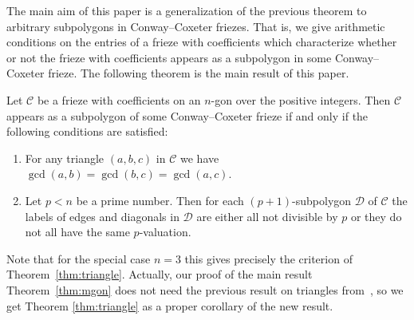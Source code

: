 \documentclass[ALCO,ThmDefs,Unicode,epreuves,published]{cedram}
\numberwithin{equation}{section}
\begin{document}
The main aim of this paper is a generalization of the previous theorem 
to arbitrary subpolygons in Conway--Coxeter friezes. That is, we give 
arithmetic conditions on the entries of a frieze with coefficients
which characterize whether
or not the frieze with coefficients appears as a subpolygon in some 
Conway--Coxeter frieze. 
The following theorem is the main result of this paper.


\begin{theo} \label{thm:mgon}
Let $\mathcal{C}$ be a frieze with coefficients 
on an $n$-gon over the positive integers. Then $\mathcal{C}$ appears as a
subpolygon
of some Conway--Coxeter frieze if and only if the following conditions are
satisfied:
\begin{enumerate}
\item \label{cond:gcd}
For any triangle $(a,b,c)$ in $\mathcal{C}$ we have
$\gcd(a,b)=\gcd(b,c)=\gcd(a,c)$.
\item \label{cond:p+1}
Let $p<n$ be a prime number. Then for each $(p+1)$-subpolygon $\mathcal{D}$
of $\mathcal{C}$ the labels of edges and diagonals in $\mathcal{D}$ are either
all not divisible by $p$ or they do not all have the same $p$-valuation.
\end{enumerate}
\end{theo}


Note that for the special case $n=3$ this gives precisely the criterion of 
Theorem~\ref{thm:triangle}. Actually, our proof of the main result 
Theorem~\ref{thm:mgon}
does not need the previous result on triangles from~\cite{CHJ}, 
so we get Theorem 
\ref{thm:triangle} as a proper corollary of the new result.
\end{document}
